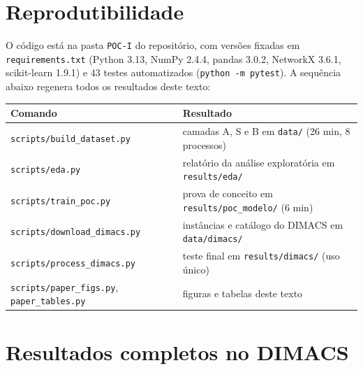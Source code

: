 \documentclass[conference,a4paper]{IEEEtran}
\newcommand{\tabela}[1]{}
\begin{document}
\section{Reprodutibilidade}\label{ap:repro}
O código está na pasta \texttt{POC-I} do repositório, com versões fixadas em
\texttt{requirements.txt} (Python 3.13, NumPy 2.4.4, pandas 3.0.2, NetworkX 3.6.1, scikit-learn
1.9.1) e 43 testes automatizados (\texttt{python -m pytest}). A sequência abaixo regenera
todos os resultados deste texto:
\begin{center}
\begin{tabular}{@{}l>{\raggedright\arraybackslash}p{9cm}@{}}
\toprule
Comando & Resultado \\
\midrule
\texttt{scripts/build\_dataset.py} & camadas A, S e B em \texttt{data/} (26 min, 8 processos) \\
\texttt{scripts/eda.py} & relatório da análise exploratória em \texttt{results/eda/} \\
\texttt{scripts/train\_poc.py} & prova de conceito em \texttt{results/poc\_modelo/} (6 min) \\
\texttt{scripts/download\_dimacs.py} & instâncias e catálogo do DIMACS em \texttt{data/dimacs/} \\
\texttt{scripts/process\_dimacs.py} & teste final em \texttt{results/dimacs/} (uso único) \\
\texttt{scripts/paper\_figs.py}, \texttt{paper\_tables.py} & figuras e tabelas deste texto \\
\bottomrule
\end{tabular}
\end{center}

\section{Resultados completos no DIMACS}
\tabela{dimacs_completa}
\end{document}
